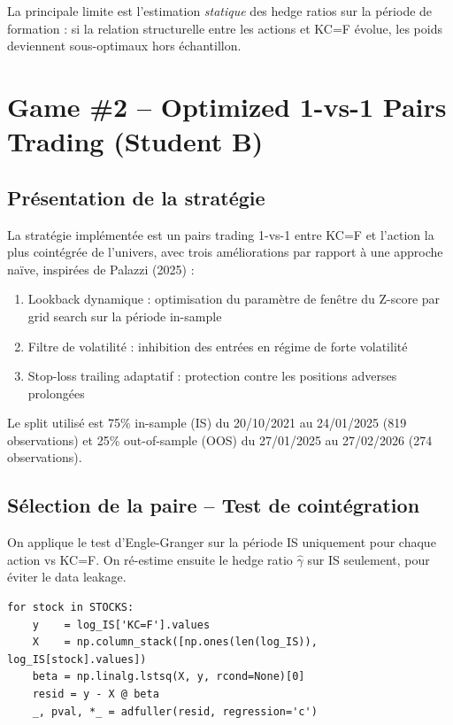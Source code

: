 \documentclass[12pt, a4paper]{article}
\begin{document}
La principale limite est l'estimation \textit{statique} des hedge ratios
sur la période de formation : si la relation structurelle entre les actions
et KC=F évolue, les poids deviennent sous-optimaux hors échantillon.

\newpage

\section{Game \#2 -- Optimized 1-vs-1 Pairs Trading (Student B)}

\subsection{Présentation de la stratégie}

La stratégie implémentée est un pairs trading 1-vs-1 entre KC=F et l'action
la plus cointégrée de l'univers, avec trois améliorations par rapport à une
approche naïve, inspirées de Palazzi (2025) \cite{palazzi2025} :

\begin{enumerate}
    \item Lookback dynamique : optimisation du paramètre de fenêtre
          du Z-score par grid search sur la période in-sample
    \item Filtre de volatilité : inhibition des entrées en régime
          de forte volatilité
    \item Stop-loss trailing adaptatif : protection contre les
          positions adverses prolongées
\end{enumerate}

Le split utilisé est 75\% in-sample (IS) du 20/10/2021 au
24/01/2025 (819 observations) et 25\% out-of-sample (OOS) du
27/01/2025 au 27/02/2026 (274 observations).

\subsection{Sélection de la paire -- Test de cointégration}

On applique le test d'Engle-Granger sur la période IS uniquement pour
chaque action vs KC=F. On ré-estime ensuite le hedge ratio $\hat{\gamma}$
sur IS seulement, pour éviter le data leakage.

\begin{lstlisting}
for stock in STOCKS:
    y    = log_IS['KC=F'].values
    X    = np.column_stack([np.ones(len(log_IS)), log_IS[stock].values])
    beta = np.linalg.lstsq(X, y, rcond=None)[0]
    resid = y - X @ beta
    _, pval, *_ = adfuller(resid, regression='c')
\end{lstlisting}
\end{document}
